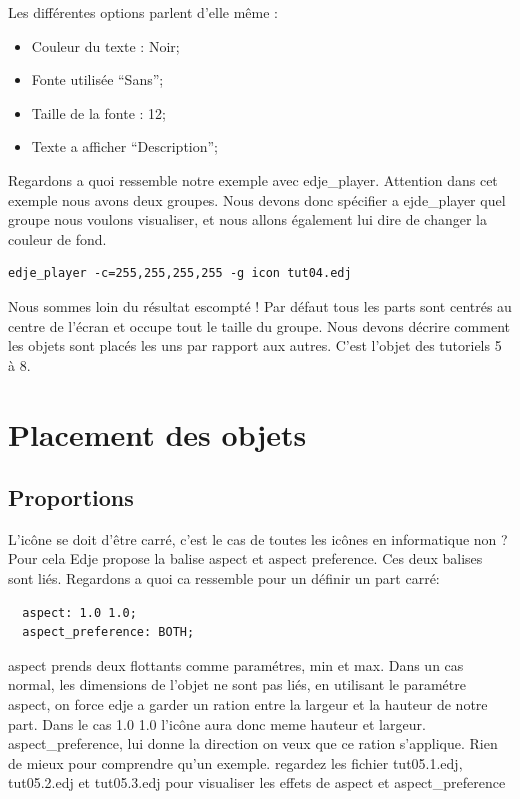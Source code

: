 \documentclass[a4paper]{efr}
\begin{document}
Les différentes options parlent d'elle même :
\begin{itemize}
\item Couleur du texte : Noir;
\item Fonte utilisée ``Sans'';
\item Taille de la fonte : 12;
\item Texte a afficher ``Description'';
\end{itemize}

Regardons a quoi ressemble notre exemple avec edje\_player. Attention dans cet
exemple nous avons deux groupes. Nous devons donc spécifier a ejde\_player quel
groupe nous voulons visualiser, et nous allons également lui dire de changer la
couleur de fond.

\begin{lstlisting}
edje_player -c=255,255,255,255 -g icon tut04.edj
\end{lstlisting}

Nous sommes loin du résultat escompté ! Par défaut tous les parts sont
centrés au centre de l'écran et occupe tout le taille du groupe. Nous devons
décrire comment les objets sont placés les uns par rapport aux autres.
C'est l'objet des tutoriels 5 à 8.


\section{Placement des objets}
\subsection{Proportions}

L'icône se doit d'être carré, c'est le cas de toutes les icônes en informatique
non ?  Pour cela Edje propose la balise aspect et aspect preference. Ces deux
balises sont liés. Regardons a quoi ca ressemble pour un définir un part carré:
\begin{lstlisting}
  aspect: 1.0 1.0;
  aspect_preference: BOTH;
\end{lstlisting}

aspect prends deux flottants comme paramétres, min et max. Dans un cas normal,
les dimensions de l'objet ne sont pas liés, en utilisant le paramétre aspect,
on force edje a garder un ration entre la largeur et la hauteur de notre part.
Dans le cas 1.0 1.0 l'icône aura donc meme hauteur et largeur.
aspect\_preference, lui donne la direction on veux que ce ration s'applique.
Rien de mieux pour comprendre qu'un exemple. regardez les fichier tut05.1.edj,
tut05.2.edj et tut05.3.edj pour visualiser les effets de aspect et
aspect\_preference
\end{document}
